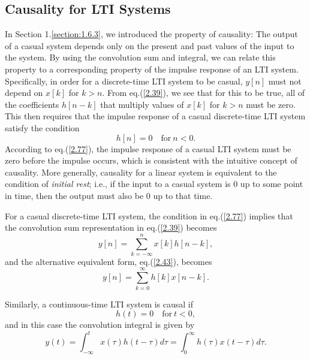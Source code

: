 \documentclass[a4paper,twoside]{book}
\begin{document}
\subsection{Causality for LTI Systems}

In Section 1.\ref{section:1.6.3}, we introduced the property of causality: The output of a casual system depends only on the present and past values of the input to the system. By using the convolution sum and integral, we can relate this property to a corresponding property of the impulse response of an LTI system. Specifically, in order for a discrete-time LTI system to be casual, $y[n]$ must not depend on $x[k]$ for $k>n$. From eq.\;(\ref{2.39}), we see that for this to be true, all of the coefficients $h[n-k]$ that multiply values of $x[k]$ for $k>n$ must be zero. This then requires that the impulse response of a casual discrete-time LTI system satisfy the condition
\begin{equation}
    h[n]=0\quad\mathrm{for~}n<0.
    \label{2.77}
\end{equation}
According to eq.\;(\ref{2.77}), the impulse response of a casual LTI system must be zero before the impulse occurs, which is consistent with the intuitive concept of causality. More generally, causality for a linear system is equivalent to the condition of \textit{initial rest}; i.e., if the input to a casual system is 0 up to some point in time, then the output must also be 0 up to that time.

For a casual discrete-time LTI system, the condition in eq.\;(\ref{2.77}) implies that the convolution sum representation in eq.\;(\ref{2.39}) becomes
\begin{equation}
    y[n]=\sum_{k=-\infty}^nx[k]h[n-k],
    \label{2.78}
\end{equation}
and the alternative equivalent form, eq.\;(\ref{2.43}), becomes
\begin{equation}
    y[n]=\sum_{k=0}^\infty h[k]x[n-k].
    \label{2.79}
\end{equation}

Similarly, a continuous-time LTI system is causal if
\begin{equation}
    h(t)=0\quad\mathrm{for~}t<0,
    \label{2.80}
\end{equation}
and in this case the convolution integral is given by
\begin{equation}
    y(t)=\int_{-\infty}^{t}x(\tau)h(t-\tau)d\tau=\int_{0}^{\infty}h(\tau)x(t-\tau)d\tau.
    \label{2.81}
\end{equation}
\end{document}
